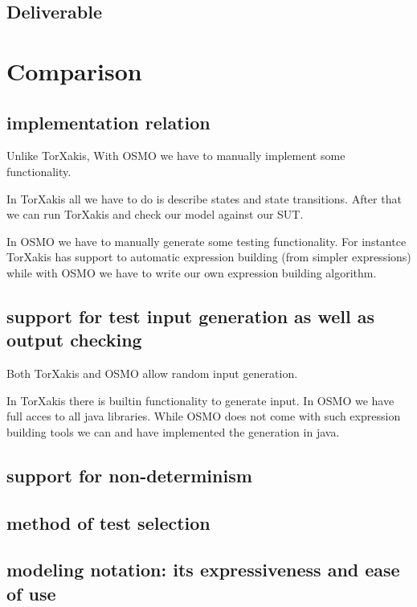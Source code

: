 \documentclass[11pt,a4paper]{article}
\begin{document}
\subsection{Deliverable}


\section{Comparison}
\subsection{implementation relation}
Unlike TorXakis, With OSMO we have to manually implement some functionality.

In TorXakis all we have to do is describe states and state
transitions. After that we can run TorXakis and check our model
against our SUT.

In OSMO we have to manually generate some testing functionality. For
instantce TorXakis has support to automatic expression building (from
simpler expressions) while with OSMO we have to write our own
expression building algorithm.

\subsection{support for test input generation as well as output checking}
Both TorXakis and OSMO allow random input generation.

In TorXakis there is builtin functionality to generate input. In OSMO
we have full acces to all java libraries. While OSMO does not come
with such expression building tools we can and have implemented the
generation in java.

\subsection{support for non-determinism}
\subsection{method of test selection}
\subsection{modeling notation: its expressiveness and ease of use}
\end{document}
